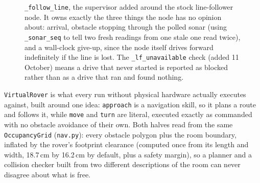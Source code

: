 \begin{figure}[htbp]
  \centering
  \caption{\texttt{\_follow\_line}, the supervisor added around the stock line-follower node. It owns exactly the three things the node has no opinion about: arrival, obstacle stopping through the polled sonar (using \texttt{\_sonar\_seq} to tell two fresh readings from one stale one read twice), and a wall-clock give-up, since the node itself drives forward indefinitely if the line is lost. The \texttt{\_lf\_unavailable} check (added 11 October) means a drive that never started is reported as blocked rather than as a drive that ran and found nothing.}
  \label{fig:flow-followline}
\end{figure}

\label{ssec:virtual_rover}

\texttt{VirtualRover} is what every run without physical hardware actually
executes against, built around one idea: \texttt{approach} is a navigation
skill, so it plans a route and follows it, while \texttt{move} and
\texttt{turn} are literal, executed exactly as commanded with no obstacle
avoidance of their own. Both halves read from the same
\texttt{OccupancyGrid} (\texttt{nav.py}): every obstacle polygon plus the
room boundary, inflated by the rover's footprint clearance (computed once
from its length and width, 18.7\,cm by 16.2\,cm by default, plus a safety
margin), so a planner and a collision checker built from two different
descriptions of the room can never disagree about what is free.

